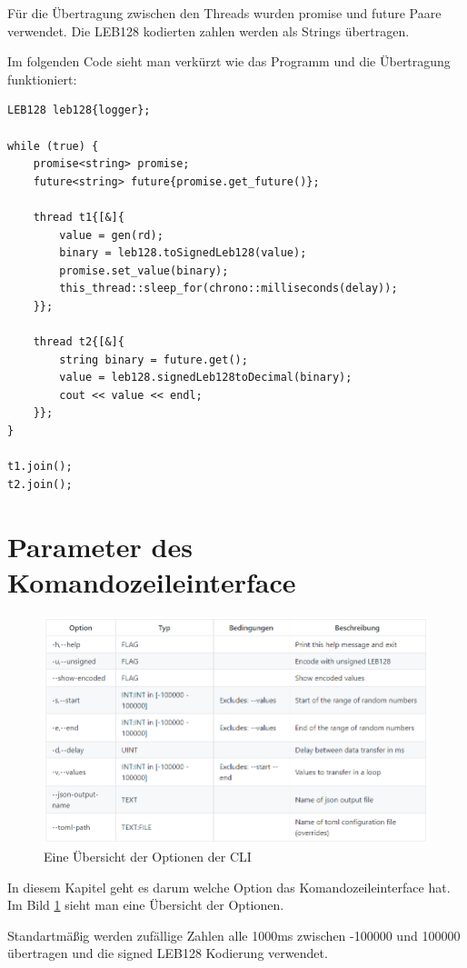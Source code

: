 \documentclass{article}
\begin{document}
Für die Übertragung zwischen den Threads wurden promise und future Paare verwendet.
Die LEB128 kodierten zahlen werden als Strings übertragen.
\pagebreak

Im folgenden Code sieht man verkürzt wie das Programm und die Übertragung funktioniert:

\begin{verbatim}
LEB128 leb128{logger};

while (true) {
    promise<string> promise;
    future<string> future{promise.get_future()};
    
    thread t1{[&]{
        value = gen(rd);
        binary = leb128.toSignedLeb128(value);
        promise.set_value(binary);
        this_thread::sleep_for(chrono::milliseconds(delay));
    }};
    
    thread t2{[&]{
        string binary = future.get();
        value = leb128.signedLeb128toDecimal(binary);
        cout << value << endl;
    }};
}

t1.join();
t2.join();
\end{verbatim}

\section{Parameter des Komandozeileinterface}

\begin{figure}[h]
\includegraphics[width=\linewidth]{clioptions}
\caption{Eine Übersicht der Optionen der CLI}
\label{fig:clioptions}
\end{figure}

In diesem Kapitel geht es darum welche Option das Komandozeileinterface hat. 
Im Bild \ref{fig:clioptions} sieht man eine Übersicht der Optionen.

Standartmäßig werden zufällige Zahlen alle 1000ms zwischen -100000 und 100000 übertragen und die signed LEB128 Kodierung verwendet.
\end{document}
